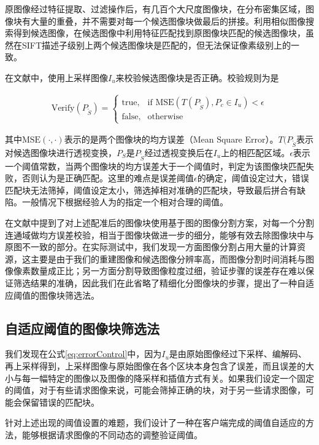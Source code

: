 原图像经过特征提取、过滤操作后，有几百个大尺度图像块，在分布密集区域，图像块有大量的重叠，并不需要对每一个候选图像块做最后的拼接。利用相似图像搜索得到候选图像，在候选图像中利用特征匹配找到原图像块匹配的候选图像块，虽然在SIFT描述子级别上两个候选图像块是匹配的，但无法保证像素级别上的一致。

在文献\cite{Dai:2012vn}中，使用上采样图像\(I_u\)来校验候选图像块是否正确。校验规则为是

\begin{align}
\label{eq:errorControl}
  \text{Verify}(P_{\tilde{S}}) = 
\begin{cases} 
\text{true}, & \mbox{if MSE} (T(P_{\tilde{S}}),P_c \in I_u) < \epsilon \\
\text{false}, & \mbox{otherwise}
\end{cases}
\end{align}

其中\(\text{MSE}(\cdot,\cdot)\)表示的是两个图像块的均方误差（Mean Square Error）。\(T(P_{\tilde{S}}\)表示对候选图像块进行透视变换，\(P_{S}\)是\(P_{\tilde{S}}\)经过透视变换后在\(I_u\)上的相匹配区域。\(\epsilon\)表示一个阈值常数，当两个图像块的均方误差大于一个阈值时，判定为该图像块匹配失败，否则认为是正确匹配。这里的难点是误差阈值\(\epsilon\)的确定，阈值设定过大，错误匹配块无法筛掉，阈值设定太小，筛选掉相对准确的匹配块，导致最后拼合有缺陷。一般情况下根据经验人为的指定一个相对合理的阈值。

在文献\cite{Dai:2012vn}中提到了对上述配准后的图像块使用基于图的图像分割方案，对每一个分割连通域做均方误差校验，相当于图像块做进一步的细分，能够有效去除图像块中与原图不一致的部分。在实际测试中，我们发现一方面图像分割占用大量的计算资源，这主要是由于我们的重建图像和候选图像分辨率高，而图像分割时间消耗与图像像素数量成正比；另一方面分割导致图像粒度过细，验证步骤的误差存在难以保证筛选结果的准确，因此我们在此省略了精细化分图像块的步骤，提出了一种自适应阈值的图像块筛选法。

\subsection{自适应阈值的图像块筛选法}

我们发现在公式\ref{eq:errorControl}中，因为\(I_u\)是由原始图像经过下采样、编解码、再上采样得到，上采样图像与原始图像在各个区块本身包含了误差，而且误差的大小与每一幅特定的图像以及图像的降采样和插值方式有关。如果我们设定一个固定的阈值，对于有些请求图像来说，可能会筛掉正确的块，对于另一些请求图像，可能会保留错误的匹配块。

针对上述出现的阈值设置的难题，我们设计了一种在客户端完成的阈值自适应的方法，能够根据请求图像的不同动态的调整验证阈值。

